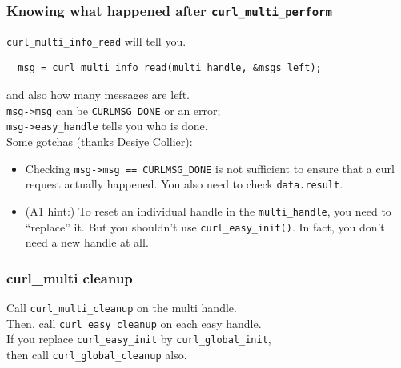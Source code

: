 \begin{frame}[fragile]
  \frametitle{Knowing what happened after {\tt curl\_multi\_perform}}

  
    {\tt curl\_multi\_info\_read} will tell you.
  
\begin{lstlisting}
  msg = curl_multi_info_read(multi_handle, &msgs_left);
\end{lstlisting}
  
    and also how many messages are left.\\[1em]
    {\tt msg->msg} can be {\tt CURLMSG\_DONE} or an error;\\
    {\tt msg->easy\_handle} tells you who is done.\\[1em]
  

    Some gotchas (thanks Desiye Collier):
    \begin{itemize}
    \item Checking \verb+msg->msg == CURLMSG_DONE+ is not sufficient to ensure that a curl request actually happened. You also need to check {\tt data.result}.

    \item (A1 hint:) To reset an individual handle in the {\tt multi\_handle}, you need to ``replace'' it. But you shouldn't use {\tt curl\_easy\_init()}.  In fact, you don't need a new handle at all.
    \end{itemize}
  

\end{frame}



\begin{frame}
  \frametitle{curl\_multi cleanup}

  
    Call {\tt curl\_multi\_cleanup} on the multi handle.\\[1em]
    Then, call {\tt curl\_easy\_cleanup} on each easy handle.\\[2em]
    If you replace {\tt curl\_easy\_init} by {\tt curl\_global\_init},\\
    then call {\tt curl\_global\_cleanup} also.
  

\end{frame}


